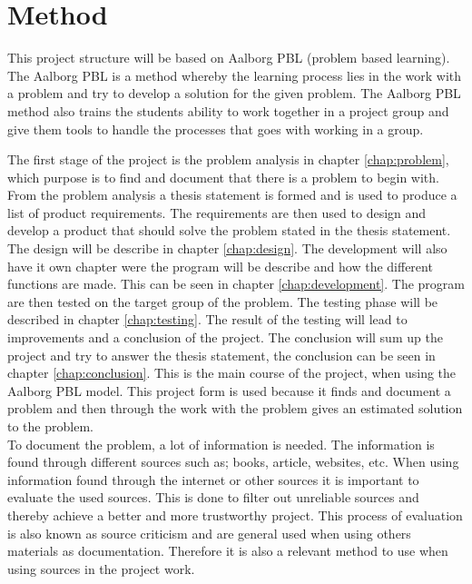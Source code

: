 \section{Method}
This project structure will be based on Aalborg PBL (problem based learning). The Aalborg PBL is a method whereby the learning process lies in the work with a problem and try to develop a solution for the given problem.
The Aalborg PBL method also trains the students ability to work together in a project group and give them tools to handle the processes that goes with working in a group.

The first stage of the project is the problem analysis in chapter \ref{chap:problem}, which purpose is to find and document that there is a problem to begin with. From the problem analysis a thesis statement is formed and is used to produce a list of product requirements.
The requirements are then used to design and develop a product that should solve the problem stated in the thesis statement. The design will be describe in chapter \ref{chap:design}.
The development will also have it own chapter were the program will be describe and how the different functions are made. This can be seen in chapter \ref{chap:development}.
The program are then tested on the target group of the problem. The testing phase will be described in chapter \ref{chap:testing}. The result of the testing will lead to improvements and a conclusion of the project. The conclusion will sum up the project and try to answer the thesis statement, the conclusion can be seen in chapter \ref{chap:conclusion}. This is the main course of the project, when using the Aalborg PBL model.
This project form is used because it finds and document a problem and then through the work with the problem gives an estimated solution to the problem.\\

To document the problem, a lot of information is needed. The information is found through different sources such as; books, article, websites, etc. When using information found through the internet or other sources it is important to evaluate the used sources.
This is done to filter out unreliable sources and thereby achieve a better and more trustworthy project.
This process of evaluation is also known as source criticism and are general used when using others materials as documentation. Therefore it is also a relevant method to use when using sources in the project work.\\
